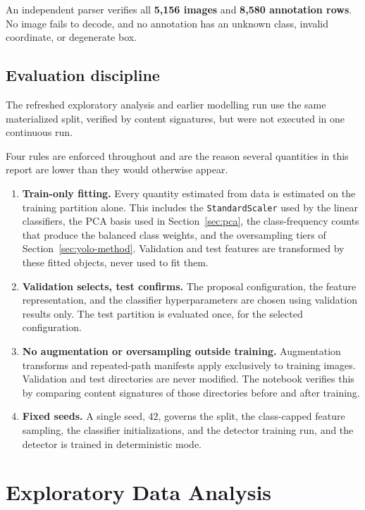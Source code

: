 \documentclass[a4paper,8pt]{article}
\begin{document}
An independent parser verifies all \textbf{5{,}156 images} and \textbf{8{,}580 annotation rows}.
No image fails to decode, and no annotation has an unknown class, invalid coordinate, or
degenerate box.

\subsection{Evaluation discipline}

The refreshed exploratory analysis and earlier modelling run use the same materialized split,
verified by content signatures, but were not executed in one continuous run.

Four rules are enforced throughout and are the reason several quantities in this report are
lower than they would otherwise appear.

\begin{enumerate}
\item \textbf{Train-only fitting.} Every quantity estimated from data is estimated on the
training partition alone. This includes the \texttt{StandardScaler} used by the linear
classifiers, the PCA basis used in Section~\ref{sec:pca}, the class-frequency counts that
produce the balanced class weights, and the oversampling tiers of
Section~\ref{sec:yolo-method}. Validation and test features are transformed by these fitted
objects, never used to fit them.
\item \textbf{Validation selects, test confirms.} The proposal configuration, the feature
representation, and the classifier hyperparameters are chosen using validation results only.
The test partition is evaluated once, for the selected configuration.
\item \textbf{No augmentation or oversampling outside training.} Augmentation transforms and
repeated-path manifests apply exclusively to training images. Validation and test directories
are never modified. The notebook verifies this by comparing content signatures of those
directories before and after training.
\item \textbf{Fixed seeds.} A single seed, $42$, governs the split, the class-capped feature
sampling, the classifier initializations, and the detector training run, and the detector is
trained in deterministic mode.
\end{enumerate}

\section{Exploratory Data Analysis}
\label{sec:eda}
\end{document}
